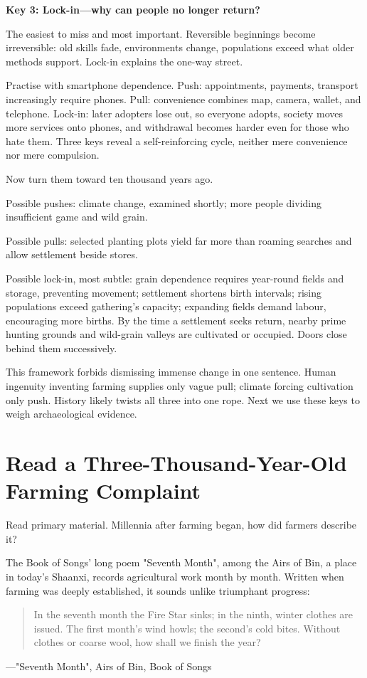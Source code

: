 \textbf{Key 3: Lock-in---why can people no longer return?}

The easiest to miss and most important. Reversible beginnings become irreversible: old skills fade, environments change, populations exceed what older methods support. Lock-in explains the one-way street.

Practise with smartphone dependence. Push: appointments, payments, transport increasingly require phones. Pull: convenience combines map, camera, wallet, and telephone. Lock-in: later adopters lose out, so everyone adopts, society moves more services onto phones, and withdrawal becomes harder even for those who hate them. Three keys reveal a self-reinforcing cycle, neither mere convenience nor mere compulsion.

Now turn them toward ten thousand years ago.

Possible pushes: climate change, examined shortly; more people dividing insufficient game and wild grain.

Possible pulls: selected planting plots yield far more than roaming searches and allow settlement beside stores.

Possible lock-in, most subtle: grain dependence requires year-round fields and storage, preventing movement; settlement shortens birth intervals; rising populations exceed gathering's capacity; expanding fields demand labour, encouraging more births. By the time a settlement seeks return, nearby prime hunting grounds and wild-grain valleys are cultivated or occupied. Doors close behind them successively.

This framework forbids dismissing immense change in one sentence. Human ingenuity inventing farming supplies only vague pull; climate forcing cultivation only push. History likely twists all three into one rope. Next we use these keys to weigh archaeological evidence.

\section[Ancient Complaints about Farm Work]{Read a Three-Thousand-Year-Old Farming Complaint}
Read primary material. Millennia after farming began, how did farmers describe it?

The Book of Songs' long poem "Seventh Month", among the Airs of Bin, a place in today's Shaanxi, records agricultural work month by month. Written when farming was deeply established, it sounds unlike triumphant progress:

\begin{quote}
In the seventh month the Fire Star sinks; in the ninth, winter clothes are issued. The first month's wind howls; the second's cold bites. Without clothes or coarse wool, how shall we finish the year?
\end{quote}
---"Seventh Month", Airs of Bin, Book of Songs

